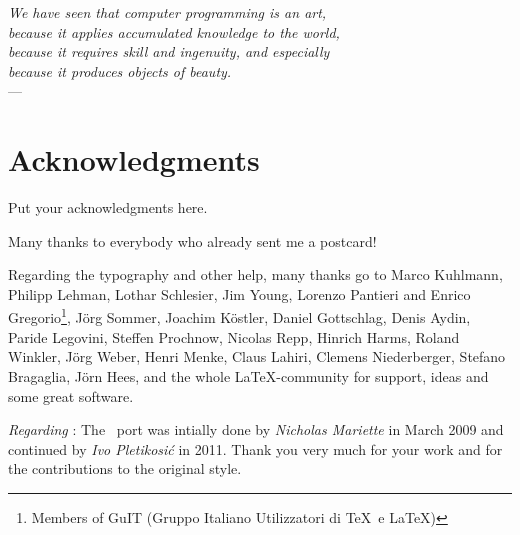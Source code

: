 
\begin{flushright}{\slshape
    We have seen that computer programming is an art, \\
    because it applies accumulated knowledge to the world, \\
    because it requires skill and ingenuity, and especially \\
    because it produces objects of beauty.} \\ \medskip
    --- %
\end{flushright}



\bigskip

\begingroup
\let\clearpage\relax
\let\cleardoublepage\relax
\let\cleardoublepage\relax
\chapter*{Acknowledgments}
Put your acknowledgments here.

Many thanks to everybody who already sent me a postcard!

Regarding the typography and other help, many thanks go to Marco
Kuhlmann, Philipp Lehman, Lothar Schlesier, Jim Young, Lorenzo
Pantieri and Enrico Gregorio\footnote{Members of GuIT (Gruppo
Italiano Utilizzatori di \TeX\ e \LaTeX )}, J\"org Sommer,
Joachim K\"ostler, Daniel Gottschlag, Denis Aydin, Paride
Legovini, Steffen Prochnow, Nicolas Repp, Hinrich Harms,
 Roland Winkler, Jörg Weber, Henri Menke, Claus Lahiri,
 Clemens Niederberger, Stefano Bragaglia, Jörn Hees,
 and the whole \LaTeX-community for support, ideas and
 some great software.

\bigskip

\noindent\emph{Regarding \mLyX}: The \mLyX\ port was intially done by
\emph{Nicholas Mariette} in March 2009 and continued by
\emph{Ivo Pletikosi\'c} in 2011. Thank you very much for your
work and for the contributions to the original style.


\endgroup
